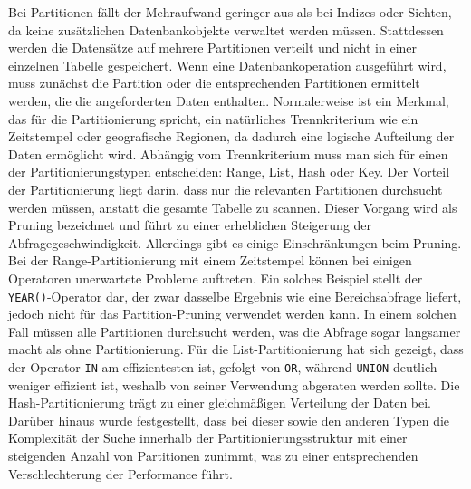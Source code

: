 Bei Partitionen fällt der Mehraufwand geringer aus als bei Indizes oder Sichten, da keine zusätzlichen Datenbankobjekte verwaltet werden müssen.
Stattdessen werden die Datensätze auf mehrere Partitionen verteilt und nicht in einer einzelnen Tabelle gespeichert.
Wenn eine Datenbankoperation ausgeführt wird, muss zunächst die Partition oder die entsprechenden Partitionen ermittelt werden, die die angeforderten Daten enthalten.
Normalerweise ist ein Merkmal, das für die Partitionierung spricht, ein natürliches Trennkriterium wie ein Zeitstempel oder geografische Regionen, da dadurch eine logische Aufteilung der Daten ermöglicht wird.
Abhängig vom Trennkriterium muss man sich für einen der Partitionierungstypen entscheiden: Range, List, Hash oder Key.
Der Vorteil der Partitionierung liegt darin, dass nur die relevanten Partitionen durchsucht werden müssen, anstatt die gesamte Tabelle zu scannen.
Dieser Vorgang wird als Pruning bezeichnet und führt zu einer erheblichen Steigerung der Abfragegeschwindigkeit.
Allerdings gibt es einige Einschränkungen beim Pruning.
Bei der Range-Partitionierung mit einem Zeitstempel können bei einigen Operatoren unerwartete Probleme auftreten.
Ein solches Beispiel stellt der \texttt{YEAR()}-Operator dar, der zwar dasselbe Ergebnis wie eine Bereichsabfrage liefert, jedoch nicht für das Partition-Pruning verwendet werden kann.
In einem solchen Fall müssen alle Partitionen durchsucht werden, was die Abfrage sogar langsamer macht als ohne Partitionierung.
Für die List-Partitionierung hat sich gezeigt, dass der Operator \texttt{IN} am effizientesten ist, gefolgt von \texttt{OR}, während \texttt{UNION} deutlich weniger effizient ist, weshalb von seiner Verwendung abgeraten werden sollte.
Die Hash-Partitionierung trägt zu einer gleichmäßigen Verteilung der Daten bei.
Darüber hinaus wurde festgestellt, dass bei dieser sowie den anderen Typen die Komplexität der Suche innerhalb der Partitionierungsstruktur mit einer steigenden Anzahl von Partitionen zunimmt, was zu einer entsprechenden Verschlechterung der Performance führt.

